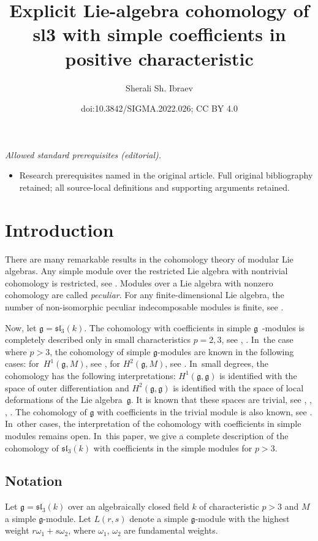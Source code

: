 \documentclass[10pt,a4paper]{amsart}
\title{Explicit Lie-algebra cohomology of sl3 with simple coefficients in positive characteristic}
\author{Sherali Sh. Ibraev}
\date{doi:10.3842/SIGMA.2022.026; CC BY 4.0}
\numberwithin{equation}{section}
\begin{document}
\maketitle
\noindent\textit{Allowed standard prerequisites (editorial).}\begin{itemize}
\item Research prerequisites named in the original article. Full original bibliography retained; all source-local definitions and supporting arguments retained.
\end{itemize}\medskip
\section{Introduction}
There are many remarkable results in the cohomology theory of modular Lie algebras. Any simple module over the restricted Lie algebra with nontrivial cohomology is restricted, see \cite[Theorem~2]{D84}. Modules over a Lie algebra with nonzero cohomology are called {\it peculiar}. For any finite-dimensional Lie algebra, the number of non-isomorphic peculiar indecomposable modules is finite, see \cite[Theorem~1]{D85}.

Now, let $\mathfrak{g}=\mathfrak{sl}_3(k)$. The cohomology with coefficients in simple $\mathfrak{g}$~-modules is completely described only in small characteristics $p=2,3$, see \cite[Theorem~1]{IT21}, \cite[Theorem~1]{IIE21}. In~the case where $p>3$, the cohomology of simple $\mathfrak{g}$-mo\-dules are known in the following cases: for~$H^1(\mathfrak{g},M)$, see \cite[p.~301]{Jan91}, for $H^2(\mathfrak{g},M)$, see \cite[Theorem~1.1]{DI02}. In~small degrees, the cohomology has the following interpretations: $H^1({\mathfrak{g}},{\mathfrak{g}})$ is identified with the space of outer differentiation and $H^2({\mathfrak{g}},{\mathfrak{g}})$ is identified with the space of local deformations of the Lie algebra~$\mathfrak{g}$. It is known that these spaces are trivial, see \cite[p.~124]{Perm05}, \cite[p.~125]{Che05}, \cite[Lemma~2.2.1b]{BGLL}, \cite[p.~32]{BGL}. The cohomology of ${\mathfrak{g}}$ with coefficients in the trivial module is also known, see \cite[p.~42]{BGL}. In~other cases, the interpretation of the cohomology with coefficients in simple modules remains open. In~this paper, we give a complete description of the cohomology of $\mathfrak{sl}_3(k)$ with coefficients in the simple modules for $p>3$.

\subsection{Notation}%
Let $\mathfrak{g}=\mathfrak{sl}_3(k)$ over an
algebraically closed field $k$ of characteristic
$p>3$ and $M$ a simple $\mathfrak{g}$-mo\-dule. Let $L(r,s)$ denote a simple $\mathfrak{g}$-module with the highest weight
$r\omega_1+s\omega_2$, where $\omega_1$, $\omega_2$ are fundamental weights.
\end{document}
